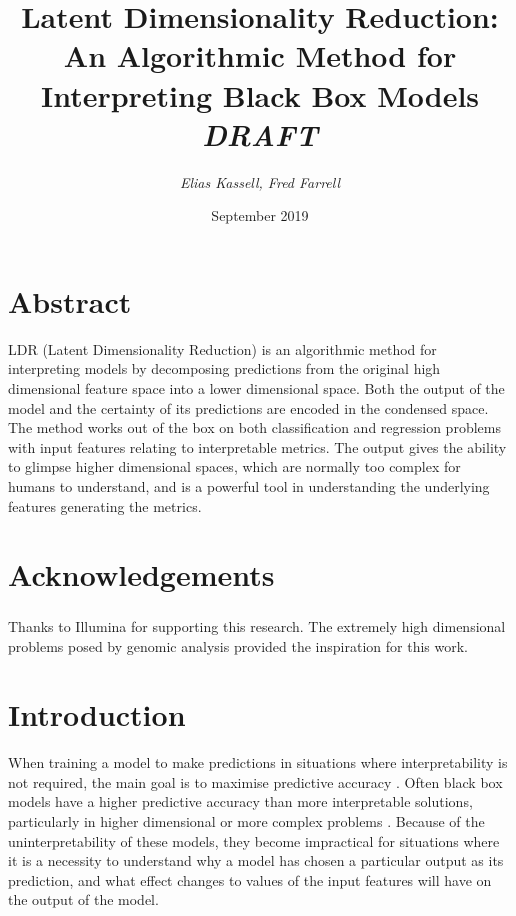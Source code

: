 \documentclass[a4paper, twocolumn]{article}
\begin{document}
\title{\huge Latent Dimensionality Reduction: An Algorithmic Method for Interpreting Black Box Models \\
\Large \emph{DRAFT}}
\author{\emph{Elias Kassell, Fred Farrell}}
\date{September 2019}
\maketitle

\section{Abstract}\label{abstract}

LDR (Latent Dimensionality Reduction) is an algorithmic method for interpreting models by decomposing predictions from the original high dimensional feature space into a lower dimensional space. Both the output of the model and the certainty of its predictions are encoded in the condensed space. The method works out of the box on both classification and regression problems with input features relating to interpretable metrics. The output gives the ability to glimpse higher dimensional spaces, which are normally too complex for humans to understand, and is a powerful tool in understanding the underlying features generating the metrics.

\section*{Acknowledgements}

Thanks to Illumina\textsuperscript{\textregistered} for supporting this research. The extremely high dimensional problems posed by genomic analysis provided the inspiration for this work.

\section{Introduction}\label{Introduction}

When training a model to make predictions in situations where interpretability is not required, the main goal is to maximise predictive accuracy \cite{two-cultures}. Often black box models have a higher predictive accuracy than more interpretable solutions, particularly in higher dimensional or more complex problems \cite{deep-learning}. Because of the uninterpretability of these models, they become impractical for situations where it is a necessity to understand why a model has chosen a particular output as its prediction, and what effect changes to values of the input features will have on the output of the model.
\end{document}
